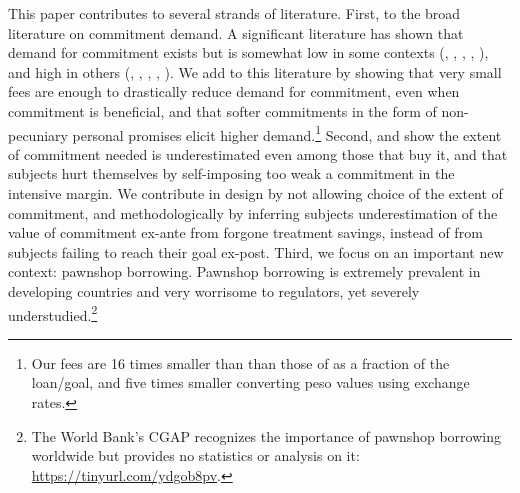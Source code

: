 \documentclass[oneside,11pt]{article}
\begin{document}
This paper contributes to several strands of literature. First, to the broad literature on commitment demand. A significant literature has shown that demand for commitment exists but is somewhat low in some contexts (\cite{Ashraf}, \cite{Gine}, \cite{Ted}, \cite{Royer}, \cite{Sprenger}), and high in others (\cite{Kremer},  \cite{Casaburi}, \cite{Alcohol}, \cite{AprajitP&P}, \cite{Pascaline}). We add to this literature by showing that very small fees are enough to drastically reduce demand for commitment, even when commitment is beneficial, and that softer commitments in the form of non-pecuniary personal promises elicit higher demand.\footnote{Our fees are 16 times smaller than than those of \cite{John} as a fraction of the loan/goal, and five times smaller converting peso values using exchange rates.} Second, \cite{Ted} and \cite{John} show the extent of commitment needed is underestimated even among those that buy it, and that subjects hurt themselves by self-imposing too weak a commitment in the intensive margin. We contribute in design by not allowing choice of the extent of commitment, and methodologically by inferring subjects underestimation of the value of commitment ex-ante from forgone treatment savings, instead of from subjects failing to reach their goal ex-post. Third, we focus on an important new context: pawnshop borrowing. Pawnshop borrowing is extremely prevalent in developing countries and very worrisome to regulators, yet severely understudied.\footnote{The World Bank's CGAP recognizes the importance of pawnshop borrowing worldwide but provides no statistics or analysis on it: \url{https://tinyurl.com/ydgob8pv}.} 
\end{document}
